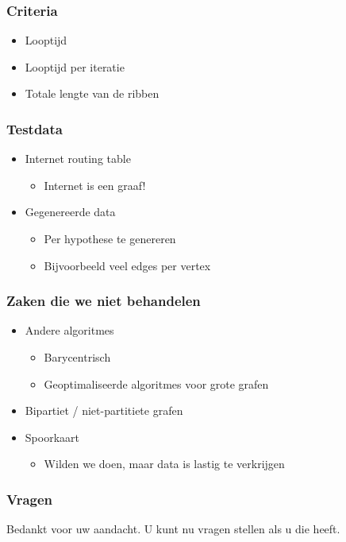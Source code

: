 \documentclass[16pt]{beamer}
\begin{document}
\begin{frame}
    \frametitle{Criteria}
    \begin{itemize}
        \item{Looptijd}
        \item{Looptijd per iteratie}
        \item{Totale lengte van de ribben}
    \end{itemize}
\end{frame}

\begin{frame}
    \frametitle{Testdata}
    \begin{itemize}
        \item{Internet routing table}
        \begin{itemize}
            \item{Internet is een graaf!}
        \end{itemize}
        \item{Gegenereerde data}
        \begin{itemize}
            \item{Per hypothese te genereren}
            \item{Bijvoorbeeld veel edges per vertex}
        \end{itemize}
    \end{itemize}
\end{frame}

\begin{frame}
    \frametitle{Zaken die we niet behandelen}
    \begin{itemize}
        \item{Andere algoritmes}
        \begin{itemize}
            \item{Barycentrisch}
            \item{Geoptimaliseerde algoritmes voor grote grafen}
        \end{itemize}
        \item{Bipartiet / niet-partitiete grafen}
        \item{Spoorkaart}
        \begin{itemize}
            \item{Wilden we doen, maar data is lastig te verkrijgen}
        \end{itemize}
    \end{itemize}
\end{frame}


\begin{frame}
    \frametitle{Vragen}
    Bedankt voor uw aandacht. U kunt nu vragen stellen als u die heeft.
\end{frame}
\end{document}
